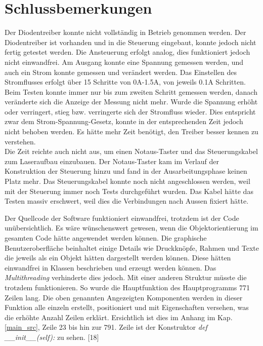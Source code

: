\section{Schlussbemerkungen}
Der Diodentreiber konnte nicht vollständig in Betrieb genommen werden. Der Diodentreiber ist vorhanden und in die Steuerung eingebaut, konnte jedoch nicht fertig getestet werden. Die Ansteuerung erfolgt analog, dies funktioniert jedoch nicht einwandfrei. Am Ausgang konnte eine Spannung gemessen werden, und auch ein Strom konnte gemessen und verändert werden. Das Einstellen des Stromflusses erfolgt über 15 Schritte von 0A-1.5A, von jeweils 0.1A Schritten. Beim Testen konnte immer nur bis zum zweiten Schritt gemessen werden, danach veränderte sich die Anzeige der Messung nicht mehr. Wurde die Spannung erhöht oder verringert, stieg bzw. verringerte sich der Stromfluss wieder. Dies entspricht zwar dem Strom-Spannung-Gesetz, konnte in der entsprechenden Zeit jedoch nicht behoben werden. Es hätte mehr Zeit benötigt, den Treiber besser kennen zu verstehen.\\


Die Zeit reichte auch nicht aus, um einen Notaus-Taster und das Steuerungskabel zum Laseraufbau einzubauen. Der Notaus-Taster kam im Verlauf der Konstruktion der Steuerung hinzu und fand in der Ausarbeitungsphase keinen Platz mehr. Das Steuerungskabel konnte noch nicht angeschlossen werden, weil mit der Steuerung immer noch Tests durchgeführt wurden. Das Kabel hätte das Testen massiv erschwert, weil dies die Verbindungen nach Aussen fixiert hätte.

Der Quellcode der Software funktioniert einwandfrei, trotzdem ist der Code unübersichtlich. Es wäre wünschenswert gewesen, wenn die Objektorientierung im gesamten Code hätte angewendet werden können. Die graphische Benutzeroberfläche beinhaltet einige Details wie Druckknöpfe, Rahmen und Texte die jeweils als ein Objekt hätten dargestellt werden können. Diese hätten einwandfrei in Klassen beschrieben und erzeugt werden können. Das \textit{Multithreading} verhinderte dies jedoch. Mit einer anderen Struktur müsste die trotzdem funktionieren. So wurde die Hauptfunktion des Hauptprogramms 771 Zeilen lang. Die oben genannten Angezeigten Komponenten werden in dieser Funktion alle einzeln erstellt, positioniert und mit Eigenschaften versehen, was die erhöhte Anzahl Zeilen erklärt. Ersichtlich ist dies im Anhang im Kap. \ref{main_src}, Zeile 23 bis hin zur 791. Zeile ist der Konstruktor \textit{def \_\_init\_\_(self):} zu sehen. [18]\\

